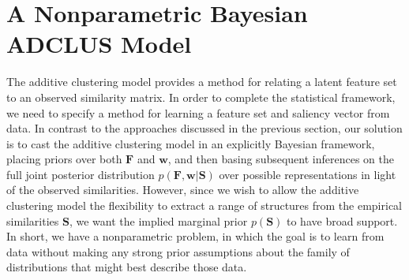 \documentclass[11pt]{article}
\newcommand{\condon}{|}
\newcommand{\efc}{\vspace*{15pt}}
\newcommand{\presec}{}
\newcommand{\postsec}{}
\newcommand{\capspace}{}
\begin{document}


\presec \section{A Nonparametric Bayesian ADCLUS Model} \postsec

The additive clustering model provides a method for relating a latent feature set to an observed similarity matrix. In order to complete the statistical framework, we need to specify a method for learning a feature set and saliency vector from data. In contrast to the approaches discussed in the previous section, our solution is to cast the additive clustering model in an explicitly Bayesian framework, placing priors over both $\mathbf{F}$ and $\mathbf{w}$, and then basing subsequent inferences on the full joint posterior distribution $p(\mathbf{F},\mathbf{w} \condon \mathbf{S})$ over possible representations in light of the observed similarities. However, since we wish to allow the additive clustering model the flexibility to extract a range of structures from the empirical similarities $\mathbf{S}$, we want the implied marginal prior $p(\mathbf{S})$ to have broad support. In short, we have a nonparametric problem, in which the goal is to learn from data without making any strong prior assumptions about the family of distributions that might best describe those data.
\end{document}
